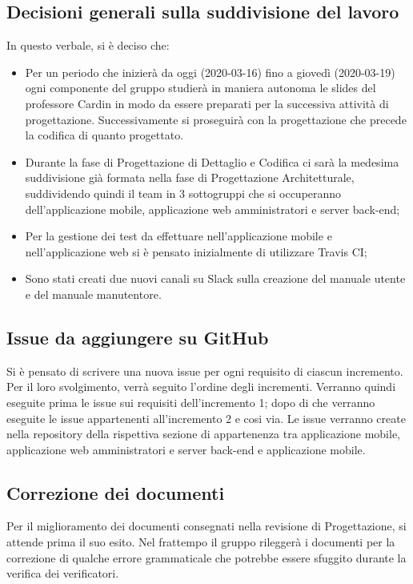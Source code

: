 \subsection{Decisioni generali sulla suddivisione del lavoro}
In questo verbale, si è deciso che:
\begin{itemize}

\item Per un periodo che inizierà da oggi (2020-03-16) fino a giovedì (2020-03-19) ogni componente del gruppo studierà in maniera autonoma le slides del professore Cardin in modo da essere preparati per la successiva attività di progettazione. Successivamente si proseguirà con la progettazione che precede la codifica di quanto progettato.	
\item Durante la fase di Progettazione di Dettaglio e Codifica ci sarà la medesima suddivisione già formata nella fase di Progettazione Architetturale, suddividendo quindi il team in 3 sottogruppi che si occuperanno dell'applicazione mobile, applicazione web amministratori e server back-end;	
	\item Per la gestione dei test da effettuare nell'applicazione mobile e nell'applicazione web si è pensato inizialmente di utilizzare Travis CI;
	\item Sono stati creati due nuovi canali su Slack sulla creazione del manuale utente e del manuale manutentore.
\end{itemize} 

\subsection{Issue da aggiungere su GitHub}
Si è pensato di scrivere una nuova issue per ogni requisito di ciascun incremento. Per il loro svolgimento, verrà seguito l'ordine degli incrementi. Verranno quindi eseguite prima le issue sui requisiti dell'incremento 1; dopo di che verranno eseguite le issue appartenenti all'incremento 2 e cosi via.
Le issue verranno create nella repository della rispettiva sezione di appartenenza tra applicazione mobile, applicazione web amministratori e server back-end e applicazione mobile.

\subsection{Correzione dei documenti}
Per il miglioramento dei documenti consegnati nella revisione di Progettazione, si attende prima il suo esito.
Nel frattempo il gruppo rileggerà i documenti per la correzione di qualche errore grammaticale che potrebbe essere sfuggito durante la verifica dei verificatori.

